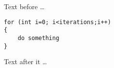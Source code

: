 \documentclass{article}
\begin{document}
Text before \dots


\begin{lstlisting}
for (int i=0; i<iterations;i++)
{
	do something
}
\end{lstlisting}


Text after it \dots
\end{document}
